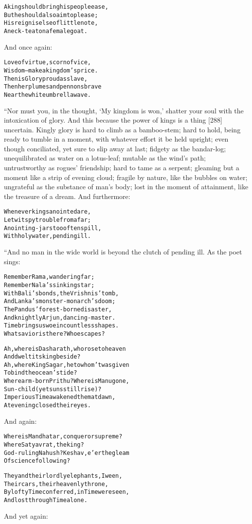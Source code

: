 \documentclass{article}
\renewenvironment{verbatim}{\begin{alltt}\normalfont\begin{centering}}{\end{centering}\end{alltt}}
\begin{document}
\begin{verbatim}
A king should bring his people ease,
But he should also aim to please;
His reign is else of little note,
A neck-teat on a female goat.
\end{verbatim}
And once again:

\begin{verbatim}
Love of virtue, scorn of vice,
Wisdom--make a kingdom's price.
Then is Glory proud as slave,
Then her plumes and pennons brave
Near the white umbrella wave.
\end{verbatim}
“Nor must you, in the thought, `My kingdom is won,' shatter your
soul with the intoxication of glory. And this because the power of
kings is a thing [288] uncertain. Kingly glory is hard to climb as
a bamboo-stem; hard to hold, being ready to tumble in a moment,
with whatever effort it be held upright; even though conciliated,
yet sure to slip away at last; fidgety as the bandar-log;
unequilibrated as water on a lotus-leaf; mutable as the wind's
path; untrustworthy as rogues' friendship; hard to tame as a
serpent; gleaming but a moment like a strip of evening cloud;
fragile by nature, like the bubbles on water; ungrateful as the
substance of man's body; lost in the moment of attainment, like the
treasure of a dream. And furthermore:

\begin{verbatim}
Whenever kings anointed are,
Let wit spy trouble from afar;
Anointing-jars too often spill,
With holy water, pending ill.
\end{verbatim}
“And no man in the wide world is beyond the clutch of pending ill.
As the poet sings:

\begin{verbatim}
Remember Rama, wandering far;
Remember Nala's sinking star;
With Bali's bonds, the Vrishnis' tomb,
And Lanka's monster-monarch's doom;
The Pandus' forest-borne disaster,
And knightly Arjun, dancing-master.
Time brings us woe in countless shapes.
What savior is there? Who escapes?

Ah, where is Dasharath, who rose to heaven
    And dwelt its king beside?
Ah, where King Sagar, he to whom 'twas given
    To bind the ocean's tide?
Where arm-born Prithu? Where is Manu gone,
    Sun-child (yet suns still rise)?
Imperious Time awakened them at dawn,
At evening closed their eyes.
\end{verbatim}
And again:

\begin{verbatim}
Where is Mandhatar, conqueror supreme?
    Where Satyavrat, the king?
God-ruling Nahush? Keshav, e'er the gleam
    Of science following?

They and their lordly elephants, I ween,
    Their cars, their heavenly throne,
By lofty Time conferred, in Time were seen,
    And lost through Time alone.
\end{verbatim}
And yet again:
\end{document}
